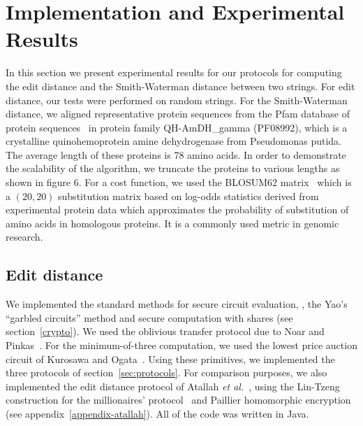 \section{Implementation and Experimental Results}
\label{sec:genomics-experimental}

In this section we present experimental results for our protocols for
computing the edit distance and the Smith-Waterman distance between
two strings.  For edit distance, our tests were performed on random
strings.  For the Smith-Waterman distance, we aligned representative protein
sequences from the Pfam database of protein sequences~\cite{pfam2002}
in protein family {\sf QH-AmDH\_gamma (PF08992)}, which is a
crystalline quinohemoprotein amine dehydrogenase from Pseudomonas
putida.  The average length of these proteins is 78 amino acids.  In
order to demonstrate the scalability of the algorithm, we truncate the
proteins to various lengths as shown in figure 6.  For a cost
function, we used the BLOSUM62 matrix~\cite{blosum62} which is a
$(20,20)$ substitution matrix based on log-odds statistics derived
from experimental protein data which approximates the probability of
substitution of amino acids in homologous proteins.  It is a commonly
used metric in genomic research.

\subsection{Edit distance}


We implemented the standard methods for secure circuit evaluation,
\ie, the Yao's ``garbled circuits'' method and secure computation with
shares (see section~\ref{crypto}).  We used the oblivious transfer
protocol due to Noar and Pinkas~\cite{Naor-Pinkas:2001}.  For the
minimum-of-three computation, we used the lowest price auction circuit of
Kurosawa and Ogata~\cite{KO02}.  Using these primitives, we implemented
the three protocols of section~\ref{sec:protocols}.  For comparison
purposes, we also implemented the edit distance protocol of Atallah
\textit{et al.}~\cite{atallah}, using the Lin-Tzeng construction for
the millionaires' protocol~\cite{lintzeng-acns05} and Paillier homomorphic
encryption~\cite{Paillier99} (see appendix~\ref{appendix-atallah}).
All of the code was written in Java.

